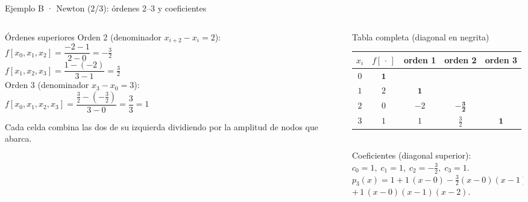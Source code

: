 \documentclass[aspectratio=169,10pt]{beamer}
\begin{document}
\begin{frame}{Ejemplo B · Newton (2/3): órdenes 2--3 y coeficientes}
\begin{columns}[T]
\begin{column}{0.46\textwidth}
\begin{cardgear}{Órdenes superiores}{\faCalculator}
{\footnotesize Orden 2 (denominador $x_{i+2}-x_i=2$):\\[0.4mm]
$f[x_0,x_1,x_2]=\dfrac{-2-1}{2-0}=-\tfrac32$\\[0.8mm]
$f[x_1,x_2,x_3]=\dfrac{1-(-2)}{3-1}=\tfrac32$\\[1.2mm]
Orden 3 (denominador $x_3-x_0=3$):\\[0.4mm]
$f[x_0,x_1,x_2,x_3]=\dfrac{\tfrac32-(-\tfrac32)}{3-0}=\dfrac{3}{3}=1$}
\end{cardgear}
\vspace{1mm}
\begin{cardnota}[\faInfoCircle]
{\footnotesize Cada celda combina las dos de su izquierda dividiendo por la amplitud de nodos que abarca.}
\end{cardnota}
\end{column}
\begin{column}{0.52\textwidth}
\begin{cardidea}{Tabla completa (diagonal en negrita)}{\faTable}
\centering
{\footnotesize\renewcommand{\arraystretch}{1.25}\setlength{\tabcolsep}{5pt}
\begin{tabular}{c|c|c|c|c}
$x_i$ & $f[\,\cdot\,]$ & orden 1 & orden 2 & orden 3\\\hline
$0$ & $\mathbf 1$ & & & \\
$1$ & $2$ & $\mathbf 1$ & & \\
$2$ & $0$ & $-2$ & $\mathbf{-\tfrac32}$ & \\
$3$ & $1$ & $1$ & $\tfrac32$ & $\mathbf 1$\\
\end{tabular}}\\[1.4mm]
{\footnotesize Coeficientes (diagonal superior):\\[0.4mm]
$c_0=1,\; c_1=1,\; c_2=-\tfrac32,\; c_3=1$.\\[0.8mm]
$p_3(x)=1+1\,(x{-}0)-\tfrac32(x{-}0)(x{-}1)$\\[0.2mm]
\hspace{10mm}$+\,1\,(x{-}0)(x{-}1)(x{-}2)$.}
\end{cardidea}
\end{column}
\end{columns}
\end{frame}
\end{document}
